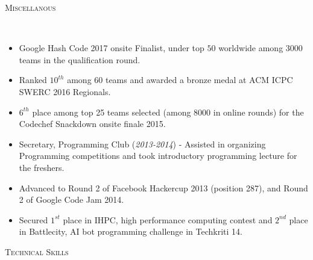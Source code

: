 \documentclass[9pt]{article}
\newenvironment{changemargin}[2]{%
  \begin{list}{}{%
    \setlength{\topsep}{0pt}%
    \setlength{\leftmargin}{#1}%
    \setlength{\rightmargin}{#2}%
    \setlength{\listparindent}{\parindent}%
    \setlength{\itemindent}{\parindent}%
    \setlength{\parsep}{\parskip}%
  }%
  \item[]}{\end{list}
}
\newcommand{\lineover}{
	\begin{changemargin}{-0.05in}{-0.10in}
		\vspace*{-9pt}
		\hrulefill \\
		\vspace*{-2pt}
	\end{changemargin}
}
\newcommand{\header}[1]{
	\begin{changemargin}{-0.5in}{-0.5in}
		\scshape{#1}\\
  	\lineover
	\end{changemargin}
}
\newenvironment{body} {
	\vspace*{-16pt}
	\begin{changemargin}{-0.6in}{-0.65in}
  }	
	{\end{changemargin}
}
\begin{document}
\vspace{1 mm}
\header{Miscellanous}
\begin{body}
	\vspace{14pt}
	\begin{changemargin}{0.15in}{0.15in}
	\begin{itemize}
       \item Google Hash Code 2017 onsite Finalist, under top $50$ worldwide among 3000 teams in the qualification round.
       \item Ranked $10^{th}$ among 60 teams and awarded a bronze medal at ACM ICPC SWERC 2016 Regionals.
	  \item $6^{th}$ place among top 25 teams selected (among 8000 in online rounds) for the Codechef Snackdown onsite finale 2015. \\
	  \item Secretary, Programming Club (\textit{2013-2014}) - Assisted in organizing Programming competitions 
	    and took introductory programming lecture for the freshers.
 	  \item Advanced to Round 2 of Facebook Hackercup 2013 (position 287), and Round 2 of Google Code Jam 2014. \\
	  \item Secured $1^{st}$ place in IHPC, high performance computing contest and $2^{nd}$ place in Battlecity, AI bot programming challenge in Techkriti 14. \\
	\end{itemize}
        \end{changemargin}
\end{body}
\vspace{3 mm}
\header{Technical Skills}
\end{document}

